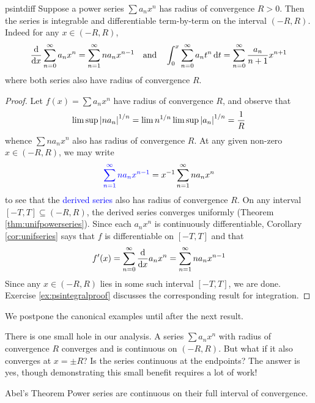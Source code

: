 \begin{thm}{}{psintdiff}
	Suppose a power series $\sum a_nx^n$ has radius of convergence $R>0$. Then the series is integrable and differentiable term-by-term on the interval $(-R,R)$. Indeed for any $x\in(-R,R)$,
	\[
		\frac{\mathrm{d} }{\mathrm{d} x}\sum\limits_{n=0}^\infty a_nx^n
		=\sum\limits_{n=1}^\infty na_nx^{n-1}
		\quad\text{and}\quad
		\int_0^x\sum\limits_{n=0}^\infty a_nt^n\,{\mathrm{d} t}
		=\sum\limits_{n=0}^\infty \frac{a_n}{n+1}x^{n+1}
	\]
	where both series also have radius of convergence $R$.
\end{thm}


\goodbreak


\begin{proof}
	Let $f(x)=\sum a_nx^n$ have radius of convergence $R$, and observe that
	\[
		\limsup\left| na_n\right|^{1/n}
		=\lim n^{1/n}\limsup\left| a_n\right|^{1/n}=\frac 1R
	\]
	whence $\sum na_nx^n$ also has radius of convergence $R$. At any given non-zero $x\in(-R,R)$, we may write
	\[
		\textcolor{blue}{\sum\limits_{n=1}^\infty na_nx^{n-1}}
		=x^{-1}\sum\limits_{n=1}^\infty na_nx^n
	\]
	to see that the \textcolor{blue}{derived series} also has radius of convergence $R$. On any interval $[-T,T]\subseteq (-R,R)$, the derived series converges uniformly (Theorem \ref{thm:unifpowerseries}). Since each $a_nx^n$ is continuously differentiable, Corollary \ref{cor:unifseries} says that $f$ is differentiable on $[-T,T]$ and that
	\[
		f'(x)=\sum\limits_{n=0}^\infty\frac{\mathrm{d} }{\mathrm{d} x}a_nx^n
		=\sum\limits_{n=1}^\infty na_nx^{n-1}
	\]
	Since any $x\in(-R,R)$ lies in some such interval $[-T,T]$, we are done.
	\medbreak
	Exercise \ref{ex:psintegralproof} discusses the corresponding result for integration.
\end{proof}


We postpone the canonical examples until after the next result.



There is one small hole in our analysis. A series $\sum a_nx^n$ with radius of convergence $R$ converges and is continuous on $(-R,R)$. But what if it also converges at $x=\pm R$? Is the series continuous at the endpoints? The answer is yes, though demonstrating this small benefit requires a lot of work!

\begin{thm}{Abel's Theorem}{}
	Power series are continuous on their full interval of convergence.
\end{thm}


